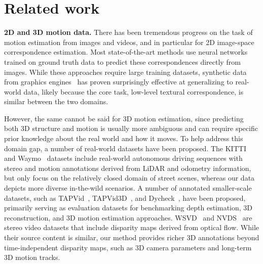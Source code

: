 \section{Related work}
\label{sec:related}




\noindent \textbf{2D and 3D motion data.} 
There has been tremendous progress on the task of motion estimation from images and videos, and in particular for 2D image-space correspondence estimation. 
Most state-of-the-art methods use neural networks trained on ground truth data to predict these correspondences directly from images. While these approaches require large training datasets, synthetic data from graphics engines~\cite{dosovitskiy2015flownet, mayer2016large, harley2022particle, butler2012naturalistic, sun2021autoflow, greff2021kubric, zheng2023point}  has proven surprisingly effective at generalizing to real-world data, likely because the core task, low-level textural correspondence, is similar between the two domains.

However, the same cannot be said for 3D motion estimation, since predicting both 3D structure and motion is usually more ambiguous and can require specific prior knowledge about the real world and how it moves. To help address this domain gap, a number of real-world datasets have been proposed. The KITTI~\cite{geiger2013vision} and Waymo~\cite{sun2020scalability} datasets include real-world autonomous driving sequences with stereo and motion annotations derived from LiDAR and odometry information, but only focus on the relatively closed domain of street scenes, whereas our data depicts more diverse in-the-wild scenarios. 
A number of annotated smaller-scale datasets, such as TAPVid~\cite{doersch2022tap}, TAPVid3D~\cite{koppula2024tapvid3d}, and Dycheck~\cite{gao2022monocular}, have been proposed, primarily serving as evaluation datasets for benchmarking depth estimation, 3D reconstruction, and 3D motion estimation approaches.
WSVD~\cite{wang2019web} and NVDS~\cite{NVDS} are stereo video datasets that include 
disparity maps derived from optical flow. While their source content is similar, our method provides richer 3D annotations beyond time-independent disparity maps, such as 3D camera parameters and long-term 3D motion tracks.




